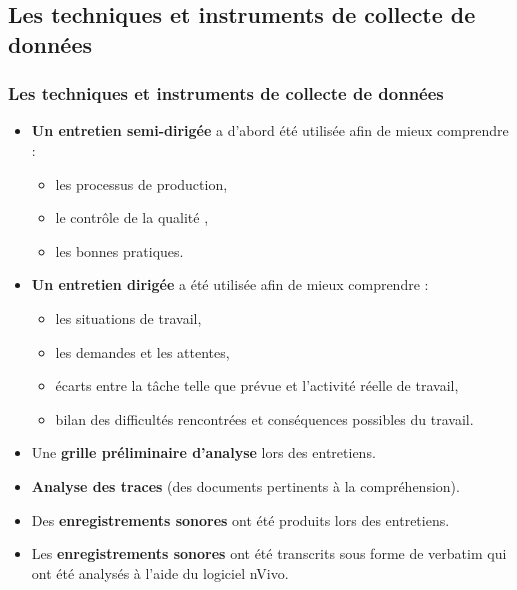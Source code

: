                        		 \subsection{Les techniques et instruments de collecte de données} 
					\begin{frame}[allowframebreaks]
						\frametitle{Les techniques et instruments de collecte de données}
                        
                        			\begin{itemize} 
                       				\item \textbf{Un entretien semi-dirigée} a d’abord été utilisée afin de mieux comprendre :
                       				\begin{itemize}
                       				 	\item les processus de production, 
                       				 	\item le contrôle de la qualité ,
                       				 	\item les bonnes pratiques.
                       				 \end{itemize}
                       				\framebreak
                       				\item \textbf{Un entretien dirigée} a été utilisée afin de mieux comprendre :
                       				\begin{itemize}
                       					\item les situations de travail,
                       					\item les demandes et les attentes,
                       					\item écarts entre la tâche telle que prévue et l’activité réelle de travail,
                       					\item bilan des difficultés rencontrées et conséquences possibles du travail.
							\end{itemize}
							\item Une \textbf{grille préliminaire d’analyse} lors des entretiens.
							\item \textbf{Analyse des traces} (des documents pertinents à la compréhension).
							\item Des \textbf{enregistrements sonores} ont été produits lors des entretiens.
							\item Les \textbf{enregistrements sonores} ont été transcrits sous forme de verbatim qui ont été analysés à l’aide du logiciel nVivo.
                       		 	\end{itemize}
                       		           
                			\end{frame}
                
